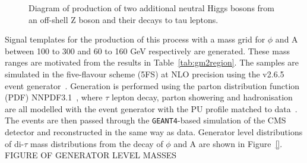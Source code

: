 \begin{figure}[H]
\centering
{}
\vspace*{10mm}
\caption{Diagram of production of two additional neutral Higgs bosons from an off-shell Z boson and their decays to tau leptons.}
\label{fig:4tau_feynamn}
\end{figure}

Signal templates for the production of this process with a mass grid for $\phi$ and A between 100 to 300 and 60 to 160 GeV respectively are generated.
These mass ranges are motivated from the results in Table~\ref{tab:gm2region}.
The samples are simulated in the five-flavour scheme (5FS) at NLO precision using the \MGvATNLO v2.6.5 event generator~\cite{Alwall:2011uj}.
Generation is performed using the parton distribution function (PDF) NNPDF3.1~\cite{Ball:2014uwa,Ball:2017nwa}, where $\tau$ lepton decay, parton showering and hadronisation are all modelled with the \PYTHIA event generator with the PU profile matched to data~\cite{Sirunyan:2019dfx,Sjostrand:2014zea}.
The events are then passed through the \texttt{GEANT4}-based \cite{Agostinelli:2002hh} simulation of the CMS detector and reconstructed in the same way as data.
Generator level distributions of di-$\tau$ mass distributions from the decay of $\phi$ and A are shown in Figure~\ref{}.\\

FIGURE OF GENERATOR LEVEL MASSES \\

